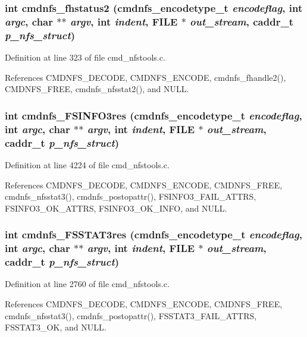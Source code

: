 \subsubsection{\setlength{\rightskip}{0pt plus 5cm}int cmdnfs\_\-fhstatus2 ({\bf cmdnfs\_\-encodetype\_\-t} {\em encodeflag}, int {\em argc}, char $\ast$$\ast$ {\em argv}, int {\em indent}, FILE $\ast$ {\em out\_\-stream}, caddr\_\-t {\em p\_\-nfs\_\-struct})}\label{cmd__nfstools_8c_a62}




Definition at line 323 of file cmd\_\-nfstools.c.

References CMDNFS\_\-DECODE, CMDNFS\_\-ENCODE, cmdnfs\_\-fhandle2(), CMDNFS\_\-FREE, cmdnfs\_\-nfsstat2(), and NULL.
\subsubsection{\setlength{\rightskip}{0pt plus 5cm}int cmdnfs\_\-FSINFO3res ({\bf cmdnfs\_\-encodetype\_\-t} {\em encodeflag}, int {\em argc}, char $\ast$$\ast$ {\em argv}, int {\em indent}, FILE $\ast$ {\em out\_\-stream}, caddr\_\-t {\em p\_\-nfs\_\-struct})}\label{cmd__nfstools_8c_a117}




Definition at line 4224 of file cmd\_\-nfstools.c.

References CMDNFS\_\-DECODE, CMDNFS\_\-ENCODE, CMDNFS\_\-FREE, cmdnfs\_\-nfsstat3(), cmdnfs\_\-postopattr(), FSINFO3\_\-FAIL\_\-ATTRS, FSINFO3\_\-OK\_\-ATTRS, FSINFO3\_\-OK\_\-INFO, and NULL.
\subsubsection{\setlength{\rightskip}{0pt plus 5cm}int cmdnfs\_\-FSSTAT3res ({\bf cmdnfs\_\-encodetype\_\-t} {\em encodeflag}, int {\em argc}, char $\ast$$\ast$ {\em argv}, int {\em indent}, FILE $\ast$ {\em out\_\-stream}, caddr\_\-t {\em p\_\-nfs\_\-struct})}\label{cmd__nfstools_8c_a97}




Definition at line 2760 of file cmd\_\-nfstools.c.

References CMDNFS\_\-DECODE, CMDNFS\_\-ENCODE, CMDNFS\_\-FREE, cmdnfs\_\-nfsstat3(), cmdnfs\_\-postopattr(), FSSTAT3\_\-FAIL\_\-ATTRS, FSSTAT3\_\-OK, and NULL.
